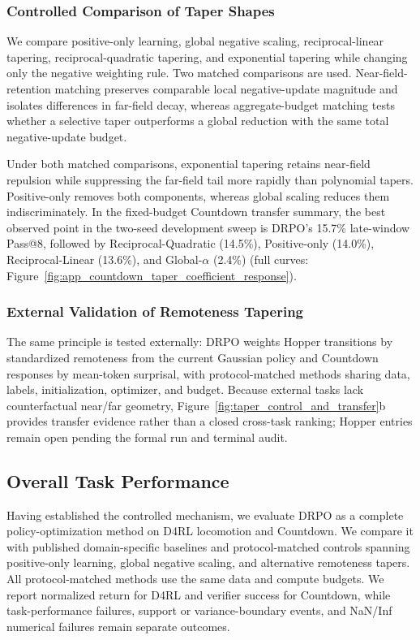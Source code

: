 \documentclass{article}
\theoremstyle{plain}
\theoremstyle{definition}
\theoremstyle{remark}
\begin{document}
\subsubsection{Controlled Comparison of Taper Shapes}
\label{sec:controlled_tapers}

We compare positive-only learning, global negative scaling,
reciprocal-linear tapering, reciprocal-quadratic tapering, and
exponential tapering while changing only the negative weighting rule. Two
matched comparisons are used. Near-field-retention matching preserves
comparable local negative-update magnitude and isolates differences in far-field
decay, whereas aggregate-budget matching tests whether a selective taper
outperforms a global reduction with the same total negative-update
budget.

Under both matched comparisons, exponential tapering retains near-field
repulsion while suppressing the far-field tail more rapidly than polynomial
tapers. Positive-only removes both components, whereas global scaling reduces
them indiscriminately. In the fixed-budget Countdown transfer summary, the
best observed point in the two-seed development sweep is DRPO's 15.7\%
late-window Pass@8, followed by Reciprocal-Quadratic (14.5\%), Positive-only
(14.0\%), Reciprocal-Linear (13.6\%), and Global-\(\alpha\) (2.4\%)
(full curves: Figure~\ref{fig:app_countdown_taper_coefficient_response}).

\subsubsection{External Validation of Remoteness Tapering}
\label{sec:external_tapers}

The same principle is tested externally: DRPO weights Hopper transitions by
standardized remoteness from the current Gaussian policy and Countdown
responses by mean-token surprisal, with protocol-matched methods sharing
data, labels, initialization, optimizer, and budget. Because external tasks
lack counterfactual near/far geometry, Figure~\ref{fig:taper_control_and_transfer}b
provides transfer evidence rather than a closed cross-task ranking; Hopper
entries remain open pending the formal run and terminal audit.

\subsection{Overall Task Performance}
\label{sec:overall_performance}

Having established the controlled mechanism, we evaluate DRPO as
a complete policy-optimization method on D4RL locomotion and Countdown.
We compare it with published domain-specific baselines and
protocol-matched controls spanning positive-only learning, global
negative scaling, and alternative remoteness tapers. All
protocol-matched methods use the same data and compute budgets. We
report normalized return for D4RL and verifier success for Countdown,
while task-performance failures, support or variance-boundary events,
and NaN/Inf numerical failures remain separate outcomes.
\end{document}
